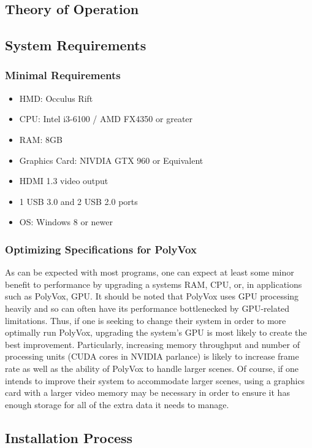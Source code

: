 \documentclass[onecolumn, draftclsnofoot,10pt, compsoc]{IEEEtran}
\begin{document}
\subsection{Theory of Operation}



\subsection{System Requirements}
\subsubsection{Minimal Requirements}
\begin{itemize}
\item HMD: Occulus Rift
\item CPU: Intel i3-6100 / AMD FX4350 or greater
\item RAM: 8GB
\item Graphics Card: NIVDIA GTX 960 or Equivalent
\item HDMI 1.3 video output
\item 1 USB 3.0 and 2 USB 2.0 ports
\item OS: Windows 8 or newer
\end{itemize}
\subsubsection{Optimizing Specifications for PolyVox}
As can be expected with most programs, one can expect at least some minor benefit to performance by upgrading a systems RAM, CPU, or, in applications such as PolyVox, GPU.
It should be noted that PolyVox uses GPU processing heavily and so can often have its performance bottlenecked by GPU-related limitations.
Thus, if one is seeking to change their system in order to more optimally run PolyVox, upgrading the system’s GPU is most likely to create the best improvement.
Particularly, increasing memory throughput and number of processing units (CUDA cores in NVIDIA parlance) is likely to increase frame rate as well as the ability of PolyVox to handle larger scenes.
Of course, if one intends to improve their system to accommodate larger scenes, using a graphics card with a larger video memory may be necessary in order to ensure it has enough storage for all of the extra data it needs to manage.

\subsection{Installation Process}
\end{document}
